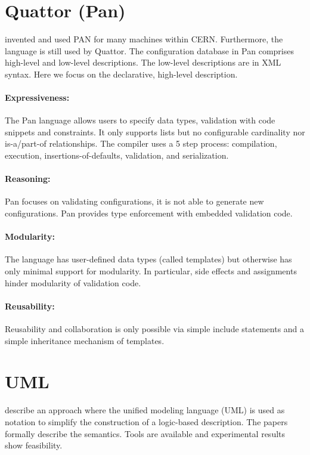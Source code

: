 \section{Quattor (Pan)}

\citet{cons2002pan} invented and used PAN for many machines within CERN.
Furthermore, the language is still used by Quattor.
The configuration database in Pan comprises high-level and low-level descriptions.
The low-level descriptions are in XML syntax.
Here we focus on the declarative, high-level description.

\paragraph*{Expressiveness:}
The Pan language allows users to specify data types, validation with code snippets and constraints.
It only supports lists but no configurable cardinality nor is-a/part-of relationships.
The compiler uses a 5 step process: compilation, execution, insertions-of-defaults, validation, and serialization.

\paragraph*{Reasoning:}
Pan focuses on validating configurations, it is not able to generate new configurations.
Pan provides type enforcement with embedded validation code.

\paragraph*{Modularity:}
The language has user-defined data types (called templates) but otherwise has only minimal support for modularity.
In particular, side effects and assignments hinder modularity of validation code.

\paragraph*{Reusability:}
Reusability and collaboration is only possible via simple include statements and a simple inheritance mechanism of templates.


\section{UML}

\citet{felfernig1999knowledge,felfernig2000uml,felfernig2002joint} describe an approach where the unified modeling language (UML) is used as notation to simplify the construction of a logic-based description.
The papers formally describe the semantics. Tools are available and experimental results show feasibility.

